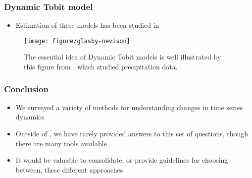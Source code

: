 \documentclass{beamer}
\begin{document}
\begin{frame}
  \frametitle{Dynamic Tobit model}
  \begin{itemize}
  \item Estimation of these models has been studied in \citep{chib1992bayes,
    manrique1998simulation, andrieu2002particle}
  \end{itemize}
 \begin{figure}[ht]
   \centering
   \texttt{[image: figure/glasby-nevison]}
   \caption{The essential idea of Dynamic Tobit models is well illustrated by
     this figure from \citep{glasbey1997rainfall}, which studied precipitation
     data. \label{fig:glasby-nevison}}
 \end{figure}
\end{frame}

\begin{frame}
  \frametitle{Conclusion}
 \begin{itemize}
 \item We surveyed a variety of methods for understanding changes in time series
   dynamics
\item Outside of \citep{digiulio2015temporal}, we have rarely provided answers to this
  set of questions, though there are many tools available
\item It would be valuable to consolidate, or provide guidelines for choosing
  between, these different approaches

 \end{itemize} 
\end{frame} 


 
\end{document}
